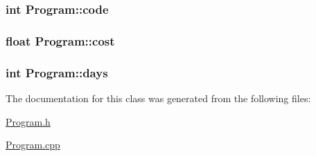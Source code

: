 \subsubsection[{\texorpdfstring{code}{code}}]{\setlength{\rightskip}{0pt plus 5cm}int Program\+::code\hspace{0.3cm}{\ttfamily [private]}}\hypertarget{classProgram_a95ee4089c38ba823287d4d9a4057cff4}{}\label{classProgram_a95ee4089c38ba823287d4d9a4057cff4}
\subsubsection[{\texorpdfstring{cost}{cost}}]{\setlength{\rightskip}{0pt plus 5cm}float Program\+::cost\hspace{0.3cm}{\ttfamily [private]}}\hypertarget{classProgram_a59057576469cca4e1b012010af18538c}{}\label{classProgram_a59057576469cca4e1b012010af18538c}
\subsubsection[{\texorpdfstring{days}{days}}]{\setlength{\rightskip}{0pt plus 5cm}int Program\+::days\hspace{0.3cm}{\ttfamily [private]}}\hypertarget{classProgram_a3b0559f1f16d662f885851113a31a3a6}{}\label{classProgram_a3b0559f1f16d662f885851113a31a3a6}


The documentation for this class was generated from the following files\+:\begin{DoxyCompactItemize}
\item 
\hyperlink{Program_8h}{Program.\+h}\item 
\hyperlink{Program_8cpp}{Program.\+cpp}\end{DoxyCompactItemize}
